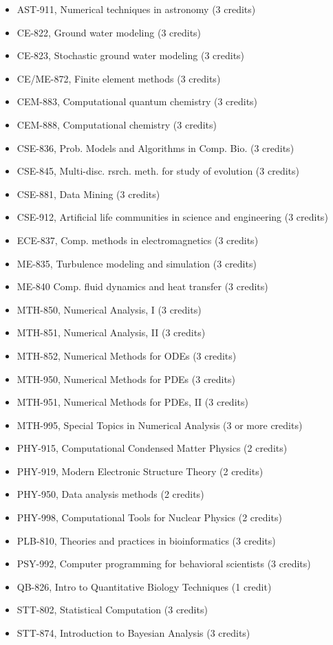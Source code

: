 \begin{itemize}
\item AST-911, Numerical techniques in astronomy (3 credits)  
\item CE-822, Ground water modeling (3 credits)  
\item CE-823, Stochastic ground water modeling (3 credits)  
\item CE/ME-872, Finite element methods (3 credits)  
\item CEM-883, Computational quantum chemistry (3 credits)  
\item CEM-888, Computational chemistry (3 credits)  
\item CSE-836, Prob. Models and Algorithms in Comp. Bio. (3 credits)  
\item CSE-845, Multi-disc. rsrch. meth. for study of evolution (3 credits)  
\item CSE-881, Data Mining (3 credits)  
\item CSE-912, Artificial life communities in science and engineering (3 credits)  
\item ECE-837, Comp. methods in electromagnetics (3 credits)  
\item ME-835, Turbulence modeling and simulation (3 credits)  
\item ME-840	Comp. fluid dynamics and heat transfer (3 credits)  
\item MTH-850, Numerical Analysis, I (3 credits)  
\item MTH-851, Numerical Analysis, II (3 credits)  
\item MTH-852, Numerical Methods for ODEs (3 credits)  
\item MTH-950, Numerical Methods for PDEs (3 credits)  
\item MTH-951, Numerical Methods for PDEs, II (3 credits)  
\item MTH-995, Special Topics in Numerical Analysis (3 or more credits)  
\item PHY-915, Computational Condensed Matter Physics (2 credits)  
\item PHY-919, Modern Electronic Structure Theory (2 credits)  
\item PHY-950, Data analysis methods (2 credits)  
\item PHY-998, Computational Tools for Nuclear Physics (2 credits)  
\item PLB-810, Theories and practices in bioinformatics (3 credits)  
\item PSY-992, Computer programming for behavioral scientists (3 credits)    
\item QB-826, Intro to Quantitative Biology Techniques (1 credit)  
\item STT-802, Statistical Computation (3 credits)  
\item STT-874, Introduction to Bayesian Analysis (3 credits) 
\end{itemize}